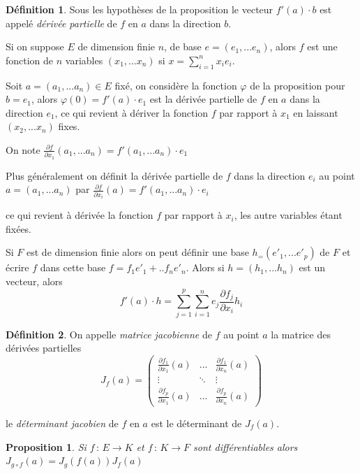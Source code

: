 \documentclass[]{article}
\newtheorem{myproposition}{Proposition}
\theoremstyle{remark}
\theoremstyle{definition}
\newtheorem{mydef}{Définition}
\newcommand{\funcshort}[3]{
#1 \, : \, #2 \longrightarrow #3
}
\begin{document}
\begin{mydef}
	Sous les hypothèses de la proposition le vecteur $f'(a) \cdot b$ est appelé \textit{dérivée partielle} de $f$ en $a$ dans la direction $b$.
\end{mydef}

Si on suppose $E$ de dimension finie $n$, de base $e=(e_1, ...e_n)$, alors $f$ est une fonction de $n$ variables $(x_1, ...x_n)$ si $\displaystyle x = \sum_{i = 1}^{n} x_i e_i$.

Soit $a=(a_1, ...a_n) \in E$ fixé, on considère la fonction $\varphi$ de la proposition pour $b = e_1$, alors $\varphi(0)
 = f'(a) \cdot e_1$ est la dérivée partielle de $f$ en $a$ dans la direction $e_1$, ce qui revient à dériver la fonction $f$ par rapport à $x_1$ en laissant $(x_2, ...x_n)$ fixes.
 
 On note $\displaystyle \frac{\partial f}{\partial x_1}(a_1, ...a_n) = f'(a_1, ...a_n)\cdot e_1$

Plus généralement on définit la dérivée partielle de $f$ dans la direction $e_i$ au point $a=(a_1, ...a_n)$ par $\displaystyle \frac{\partial f}{\partial x_i}(a) = f'(a_1, ...a_n)\cdot e_i$

ce qui revient à dérivée la fonction $f$ par rapport à $x_i$, les autre variables étant fixées.

Si $F$ est de dimension finie alors on peut définir une base $h_=(e'_1, ...e'_p)$ de $F$ et écrire $f$ dans cette base $f=f_1 e'_1 + ..f_n e'_n$. Alors si $h=(h_1, ...h_n)$ est un vecteur, alors $$f'(a) \cdot h = \sum_{j = 1}^{p} \sum_{i = 1}^{n} e_j \frac{\partial f_j}{\partial x_i} h_i$$

\begin{mydef}
	On appelle \textit{matrice jacobienne} de $f$ au point $a$ la matrice des dérivées partielles
	$$J_f(a) = \left(
		\begin{array}{ccc}
			\frac{\partial f_1}{\partial x_1}(a) & ... & \frac{\partial f_1}{\partial x_n}(a) \\
			\vdots & \ddots & \vdots \\
			\frac{\partial f_p}{\partial x_1}(a) & ... & \frac{\partial f_p}{\partial x_n}(a)
		\end{array}
	\right)$$
	
	le \textit{déterminant jacobien} de $f$ en $a$ est le déterminant de $J_f(a)$.
\end{mydef}

\begin{myproposition}
	Si $\funcshort{f}{E}{K}$ et $\funcshort{f}{K}{F}$ sont différentiables alors $J_{g \circ f}(a) = J_g(f(a))J_f(a)$
\end{myproposition}
\end{document}

